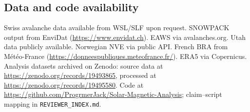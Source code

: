 \documentclass[11pt,letterpaper]{article}
\begin{document}
\subsection*{Data and code availability}

Swiss avalanche data available from WSL/SLF upon request. SNOWPACK output from EnviDat (\url{https://www.envidat.ch}). EAWS via avalanches.org. Utah data publicly available. Norwegian NVE via public API. French BRA from M\'et\'eo-France (\url{https://donneespubliques.meteofrance.fr/}). ERA5 via Copernicus. Analysis datasets archived on Zenodo: source data at \url{https://zenodo.org/records/19493865}, processed at \url{https://zenodo.org/records/19495580}. Code at \url{https://github.com/ProgrmerJack/Solar-Magnetic-Analysis}; claim--script mapping in \texttt{REVIEWER\_INDEX.md}.
\end{document}
